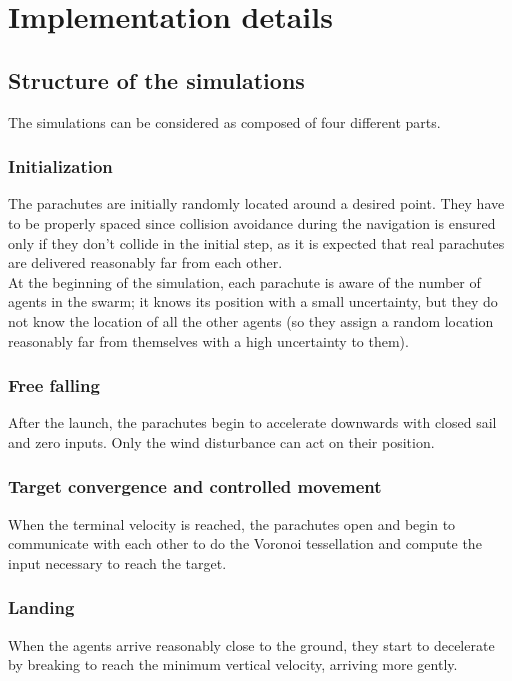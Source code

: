 \section{Implementation details}\label{sec:implementation_details}

\subsection{Structure of the simulations}
The simulations can be considered as composed of four different parts.
\subsubsection{Initialization}
The parachutes are initially randomly located around a desired point. They have to be properly spaced since collision avoidance during the navigation is ensured only if they don't collide in the initial step, as it is expected that real parachutes are delivered reasonably far from each other. \\
At the beginning of the simulation, each parachute is aware of the number of agents in the swarm; it knows its position with a small uncertainty, but they do not know the location of all the other agents (so they assign a random location reasonably far from themselves with a high uncertainty to them).
\subsubsection{Free falling}
After the launch, the parachutes begin to accelerate downwards with closed sail and zero inputs. Only the wind disturbance can act on their position.
\subsubsection{Target convergence and controlled movement}
When the terminal velocity is reached, the parachutes open and begin to communicate with each other to do the Voronoi tessellation and compute the input necessary to reach the target.
\subsubsection{Landing}
When the agents arrive reasonably close to the ground, they start to decelerate by breaking to reach the minimum vertical velocity, arriving more gently.


